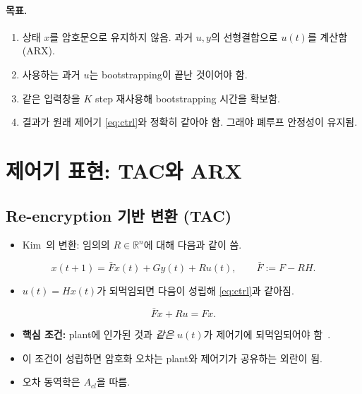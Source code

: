 \documentclass[11pt,a4paper]{article}
\newcommand{\Fb}{\bar F}
\begin{document}
\paragraph{목표.}
\begin{enumerate}
\item[(G1)] 상태 $x$를 암호문으로 유지하지 않음. 과거 $u,y$의 선형결합으로 $u(t)$를 계산함 (ARX).
\item[(G2)] 사용하는 과거 $u$는 bootstrapping이 끝난 것이어야 함.
\item[(G3)] 같은 입력창을 $K$ step 재사용해 bootstrapping 시간을 확보함.
\item[(G4)] 결과가 원래 제어기 \eqref{eq:ctrl}와 정확히 같아야 함. 그래야 폐루프 안정성이 유지됨.
\end{enumerate}

\section{제어기 표현: TAC와 ARX}

\subsection{Re-encryption 기반 변환 (TAC)}
\begin{itemize}
\item Kim~\cite{kim}의 변환: 임의의 $R\in\mathbb R^n$에 대해 다음과 같이 씀.
\end{itemize}
\begin{equation}
x(t+1)=\Fb x(t)+Gy(t)+Ru(t),\qquad \Fb:=F-RH .
\label{eq:tac}
\end{equation}
\begin{itemize}
\item $u(t)=Hx(t)$가 되먹임되면 다음이 성립해 \eqref{eq:ctrl}과 같아짐.
\end{itemize}
\begin{equation}
\Fb x+Ru=Fx .
\end{equation}
\begin{itemize}
\item \textbf{핵심 조건:} plant에 인가된 것과 \emph{같은} $u(t)$가 제어기에 되먹임되어야 함~\cite[Sec.~I-A]{kim}.
\item 이 조건이 성립하면 암호화 오차는 plant와 제어기가 공유하는 외란이 됨.
\item 오차 동역학은 $A_{cl}$을 따름.
\end{itemize}
\end{document}
